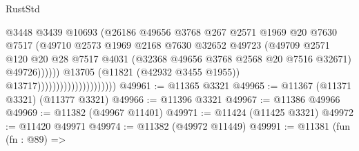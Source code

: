 \begin{lexlean}{RustStd}
\begin{coremodule}
                                                    @3448
                                                    @3439
                                                    @10693
                                                    (@26186
                                                      @49656
                                                      @3768
                                                      @267
                                                      @2571
                                                      @1969
                                                      @20
                                                      @7630
                                                      @7517
                                                      (@49710
                                                        @2573
                                                        @1969
                                                        @2168
                                                        @7630
                                                        @32652
                                                        @49723
                                                        (@49709
                                                          @2571
                                                          @120
                                                          @20
                                                          @28
                                                          @7517
                                                          @4031
                                                          (@32368
                                                            @49656
                                                            @3768
                                                            @2568
                                                            @20
                                                            @7516
                                                            @32671)
                                                          @49726))))))
                                              @13705
                                              (@11821 (@42932 @3455 @1955))
                                              @13717)))))))))))))))))))))
@49961 := @11365 @3321
@49965 := @11367 (@11371 @3321) (@11377 @3321)
@49966 := @11396 @3321
@49967 := @11386 @49966
@49969 := @11382 (@49967 @11401)
@49971 := @11424 (@11425 @3321)
@49972 := @11420 @49971
@49974 := @11382 (@49972 @11449)
@49991 := @11381
    (fun (fn : @89) =>

\end{coremodule}
\end{lexlean}
